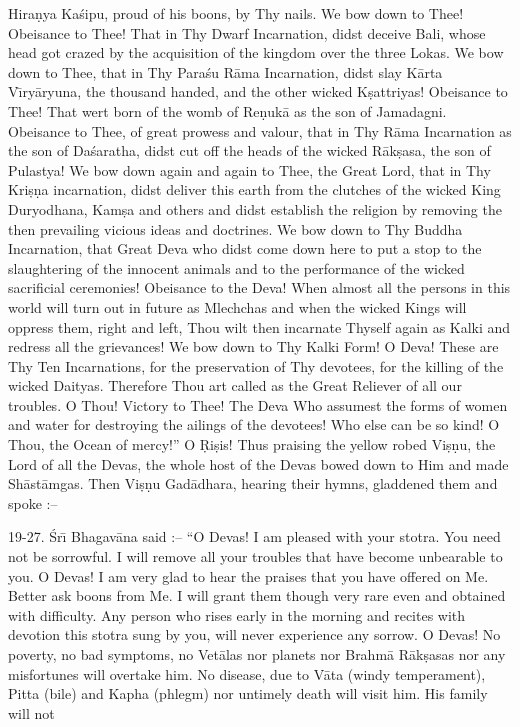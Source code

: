 Hira\d{n}ya Ka\'sipu, proud of his boons, by Thy nails. We bow down to Thee! Obeisance to Thee! That in Thy Dwarf Incarnation, didst deceive Bali, whose head got crazed by the acquisition of the kingdom over the three Lokas. We bow down to Thee, that in Thy Para\'su R\=ama Incarnation, didst slay K\=arta V\={\i}ry\=aryuna, the thousand handed, and the other wicked K\d{s}attriyas! Obeisance to Thee! That wert born of the womb of Re\d{n}uk\=a as the son of Jamadagni. Obeisance to Thee, of great prowess and valour, that in Thy R\=ama Incarnation as the son of Da\'saratha, didst cut off the heads of the wicked R\=ak\d{s}asa, the son of Pulastya! We bow down again and again to Thee, the Great Lord, that in Thy Kri\d{s}\d{n}a incarnation, didst deliver this earth from the clutches of the wicked King Duryodhana, Kam\d{s}a and others and didst establish the religion by removing the then prevailing vicious ideas and doctrines. We bow down to Thy Buddha Incarnation, that Great Deva who didst come down here to put a stop to the slaughtering of the innocent animals and to the performance of the wicked sacrificial ceremonies! Obeisance to the Deva! When almost all the persons in this world will turn out in future as Mlechchas and when the wicked Kings will oppress them, right and left, Thou wilt then incarnate Thyself again as Kalki and redress all the grievances! We bow down to Thy Kalki Form! O Deva! These are Thy Ten Incarnations, for the preservation of Thy devotees, for the killing of the wicked Daityas. Therefore Thou art called as the Great Reliever of all our troubles. O Thou! Victory to Thee! The Deva Who assumest the forms of women and water for destroying the ailings of the devotees! Who else can be so kind! O Thou, the Ocean of mercy!'' O \d{R}i\d{s}is! Thus praising the yellow robed Vi\d{s}\d{n}u, the Lord of all the Devas, the whole host of the Devas bowed down to Him and made Sh\=ast\=amgas. Then Vi\d{s}\d{n}u Gad\=adhara, hearing their hymns, gladdened them and spoke :--

19-27. \'Sr\={\i} Bhagav\=ana said :-- ``O Devas! I am pleased with your stotra. You need not be sorrowful. I will remove all your troubles that have become unbearable to you. O Devas! I am very glad to hear the praises that you have offered on Me. Better ask boons from Me. I will grant them though very rare even and obtained with difficulty. Any person who rises early in the morning and recites with devotion this stotra sung by you, will never experience any sorrow. O Devas! No poverty, no bad symptoms, no Vet\=alas nor planets nor Brahm\=a R\=ak\d{s}asas nor any misfortunes will overtake him. No disease, due to V\=ata (windy temperament), Pitta (bile) and Kapha (phlegm) nor untimely death will visit him. His family will not

